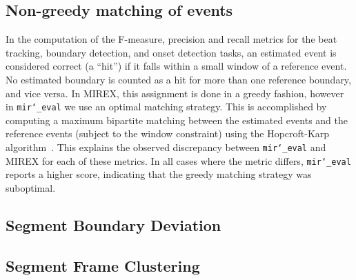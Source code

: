 \documentclass{article}
\def\mireval{\texttt{mir\char`_eval}}
\begin{document}
\subsection{Non-greedy matching of events}

In the computation of the F-measure, precision and recall metrics for the beat tracking, boundary detection, and onset detection tasks, an estimated event is considered correct (a ``hit'') if it falls within a small window of a reference event.
No estimated boundary is counted as a hit for more than one reference boundary, and vice versa.
In MIREX, this assignment is done in a greedy fashion, however in \mireval{} we use an optimal matching strategy.
This is accomplished by computing a maximum bipartite matching between the estimated events and the reference events (subject to the window constraint) using the Hopcroft-Karp algorithm~\cite{hopcroft1973n}.
This explains the observed discrepancy between \mireval{} and MIREX for each of these metrics.
In all cases where the metric differs, \mireval{} reports a higher score, indicating that the greedy matching strategy was suboptimal.

\subsection{Segment Boundary Deviation}


\subsection{Segment Frame Clustering}



\end{document}
